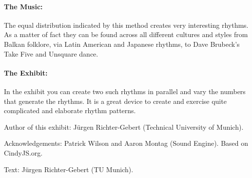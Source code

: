 \paragraph{The Music:} The equal distribution indicated by this method creates very interesting rhythms. As a matter of fact they can be found across all different cultures and styles from Balkan folklore, via Latin American and Japanese rhythms, to Dave Brubeck's Take Five and Unsquare dance.

\paragraph{The Exhibit:} In the exhibit you can create two such rhythms in parallel and vary the numbers that generate the rhythms. It is a great device to create and exercise quite complicated and elaborate rhythm patterns.




\begin{sectcredits}
\item[Author of this exhibit:] Jürgen Richter-Gebert (Technical University of Munich).

\item[Acknowledgements:] Patrick Wilson and Aaron Montag (Sound Engine). Based on CindyJS.org.

\item[Text:] Jürgen Richter-Gebert (TU Munich).
\end{sectcredits}
